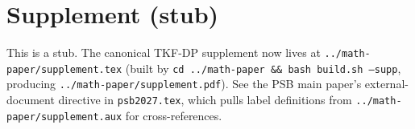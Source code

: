 \documentclass[11pt]{article}
\begin{document}
\section*{Supplement (stub)}

This is a stub. The canonical TKF-DP supplement now lives at
\texttt{../math-paper/supplement.tex} (built by
\texttt{cd ../math-paper \&\& bash build.sh --supp}, producing
\texttt{../math-paper/supplement.pdf}). See the PSB main paper's
external-document directive in \texttt{psb2027.tex}, which pulls
label definitions from \texttt{../math-paper/supplement.aux} for
cross-references.
\end{document}
